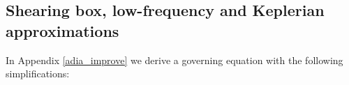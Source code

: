 



\subsection{Shearing box, low-frequency and Keplerian
  approximations}\label{approx_gov} 

In Appendix \ref{adia_improve} we derive a governing equation with the following simplifications:

